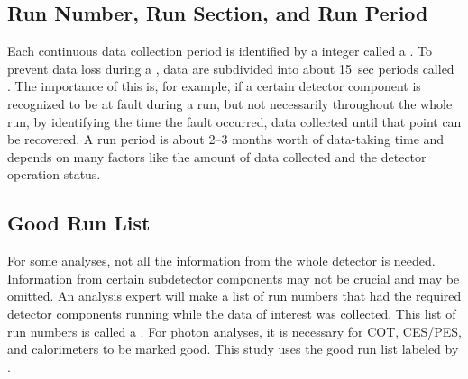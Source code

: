 \subsection{Run Number, Run Section, and Run Period}
Each continuous data collection period is identified by a integer called a . To prevent data loss during a , data are subdivided into about 15~sec periods called . The importance of this is, for example, if a certain detector component is recognized to be at fault during a run, but not necessarily throughout the whole run, by identifying the time the fault occurred, data collected until that point can be recovered. A run period is about 2--3 months worth of data-taking time and depends on many factors like the amount of data collected and the detector operation status.

\subsection{Good Run List}\label{sec:GoodRun}
For some analyses, not all the information from the whole detector is needed. Information from certain subdetector components may not be crucial and may be omitted. An analysis expert will make a list of run numbers that had the required detector components running while the data of interest was collected. This list of run numbers is called a . For photon analyses, it is necessary for COT, CES/PES, and calorimeters to be marked good. This study uses the good run list labeled by \goodrunfile.

